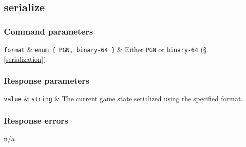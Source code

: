 \subsection{serialize}

\subsubsection{Command parameters}

\begin{CommandParameters}
    \texttt{format}
        & \texttt{enum \{ PGN, binary-64 \}}
        & Either \texttt{PGN} or \texttt{binary-64} (\hyperref[serialization]{§ \ref{serialization}}). \\
\end{CommandParameters}

\subsubsection{Response parameters}

\begin{ResponseParameters}
    \texttt{value}
        & \texttt{string}
        & The current game state serialized using the specified format. \\
\end{ResponseParameters}

\subsubsection{Response errors}

n/a
